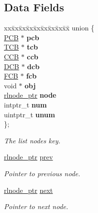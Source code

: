 \subsection*{Data Fields}
\begin{DoxyCompactItemize}
\item 
\begin{tabbing}
xx\=xx\=xx\=xx\=xx\=xx\=xx\=xx\=xx\=\kill
union \{\\
\>\hyperlink{group__proc_gadf327f09ee935cf1734c14e8849f0421}{PCB} $\ast$ {\bfseries pcb}\\
\>\hyperlink{group__scheduler_gaf88d9c946bf70b36a1e8bc34383abfc9}{TCB} $\ast$ {\bfseries tcb}\\
\>\hyperlink{group__scheduler_ga7485b31e0dd9fd723bc2d75fba5206a0}{CCB} $\ast$ {\bfseries ccb}\\
\>\hyperlink{group__dev_gaf0e2d4a982667466d84f6fb7522611d6}{DCB} $\ast$ {\bfseries dcb}\\
\>\hyperlink{group__streams_ga0c7e751afb9d6cadebf070961804d400}{FCB} $\ast$ {\bfseries fcb}\\
\>void $\ast$ {\bfseries obj}\\
\>\hyperlink{group__rlists_gaae2ea9be18d20f0c80a62a2f8e2eed4d}{rlnode\_ptr} {\bfseries node}\\
\>intptr\_t {\bfseries num}\\
\>uintptr\_t {\bfseries unum}\\
\}; \\

\end{tabbing}\begin{DoxyCompactList}\small\item\em The list node\textquotesingle{}s key. \end{DoxyCompactList}\item 
\mbox{\label{structresource__list__node_a280b77fdcee186bcaade02f76322d183}} 
\hyperlink{group__rlists_gaae2ea9be18d20f0c80a62a2f8e2eed4d}{rlnode\+\_\+ptr} \hyperlink{structresource__list__node_a280b77fdcee186bcaade02f76322d183}{prev}
\begin{DoxyCompactList}\small\item\em Pointer to previous node. \end{DoxyCompactList}\item 
\mbox{\label{structresource__list__node_a04b1ee9524cd800f14de2925141e3762}} 
\hyperlink{group__rlists_gaae2ea9be18d20f0c80a62a2f8e2eed4d}{rlnode\+\_\+ptr} \hyperlink{structresource__list__node_a04b1ee9524cd800f14de2925141e3762}{next}
\begin{DoxyCompactList}\small\item\em Pointer to next node. \end{DoxyCompactList}\end{DoxyCompactItemize}


